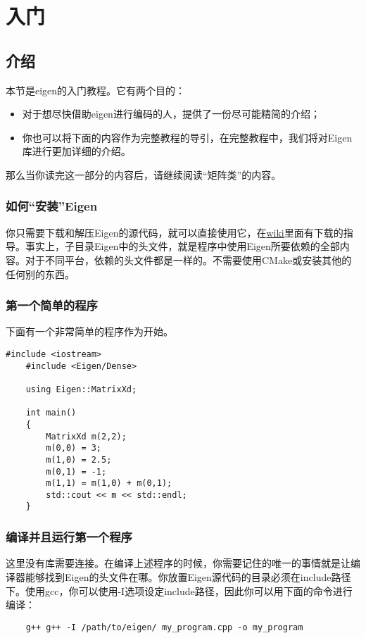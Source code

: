 \chapter{入门}
\section{介绍}
本节是eigen的入门教程。它有两个目的：
\begin{itemize}
	\item 对于想尽快借助eigen进行编码的人，提供了一份尽可能精简的介绍；
	\item 你也可以将下面的内容作为完整教程的导引，在完整教程中，我们将对Eigen库进行更加详细的介绍。
\end{itemize}

那么当你读完这一部分的内容后，请继续阅读“矩阵类”的内容。

\subsection{如何“安装”Eigen}

你只需要下载和解压Eigen的源代码，就可以直接使用它，在\href{http://eigen.tuxfamily.org/index.php?title=Main_Page#Download}{wiki}里面有下载的指导。事实上，子目录Eigen中的头文件，就是程序中使用Eigen所要依赖的全部内容。对于不同平台，依赖的头文件都是一样的。不需要使用CMake或安装其他的任何别的东西。

\subsection{第一个简单的程序}

下面有一个非常简单的程序作为开始。

\begin{lstlisting}[style=Cpp]
	#include <iostream>
	#include <Eigen/Dense>
	
	using Eigen::MatrixXd;
	
	int main()
	{
		MatrixXd m(2,2);
		m(0,0) = 3;
		m(1,0) = 2.5;
		m(0,1) = -1;
		m(1,1) = m(1,0) + m(0,1);
		std::cout << m << std::endl;
	}
\end{lstlisting}

\subsection{编译并且运行第一个程序}
这里没有库需要连接。在编译上述程序的时候，你需要记住的唯一的事情就是让编译器能够找到Eigen的头文件在哪。你放置Eigen源代码的目录必须在include路径下。使用gcc，你可以使用-I选项设定include路径，因此你可以用下面的命令进行编译：
\begin{lstlisting}
	g++ g++ -I /path/to/eigen/ my_program.cpp -o my_program
\end{lstlisting}

